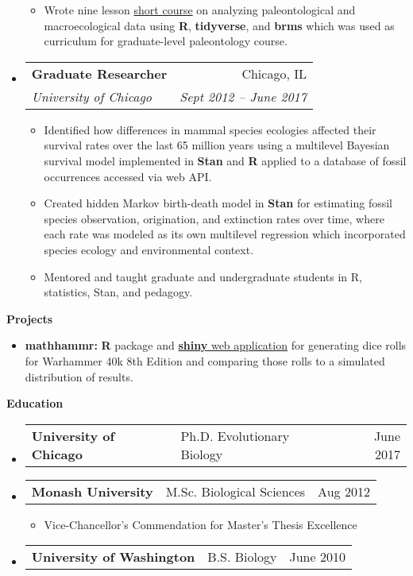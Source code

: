 \documentclass[letterpaper,10pt]{article}
\makeatletter
\newcommand{\resitem}[1]{\item #1 \vspace{-2pt}}
\newcommand{\resheading}[1]{
  {\large \colorbox{mygrey}{\begin{minipage}{\textwidth}{\textbf{#1 \vphantom{p\^{E}}}}\end{minipage}}}
}
\newcommand{\ressubheading}[4]{
  \begin{tabular*}{6.5in}{l@{\extracolsep{\fill}}r}
    \textbf{#1} & #2 \\
    \textit{#3} & \textit{#4} \\
\end{tabular*}\vspace{-6pt}}
\newcommand{\ressubheadingb}[3]{
  \begin{tabular*}{6.5in}{ll@{\extracolsep{\fill}}r}
    \textbf{#1} & \hspace{0.1mm} #2 & #3 \\
\end{tabular*}\vspace{-6pt}}
\makeatother
\begin{document}
\begin{itemize}[itemsep=0mm]
{\begin{itemize}
          \resitem{Wrote nine lesson \href{https://psmits.github.io/paleo_book/index.html}{short course} on analyzing paleontological and macroecological data using \textbf{R}, \textbf{tidyverse}, and \textbf{brms}  which was used as curriculum for graduate-level paleontology course.}
      \end{itemize}
    }
  \item 
    \ressubheading{Graduate Researcher}{Chicago, IL}{University of Chicago}{Sept 2012 -- June 2017}
    { %
      \begin{itemize}
          \resitem{Identified how differences in mammal species ecologies affected their survival rates over the last 65 million years using a multilevel Bayesian survival model implemented in \textbf{Stan} and \textbf{R} applied to a database of fossil occurrences accessed via web API.}
          \resitem{Created hidden Markov birth-death model in \textbf{Stan} for estimating fossil species observation, origination, and extinction rates over time, where each rate was modeled as its own multilevel regression which incorporated species ecology and environmental context.}
          \resitem{Mentored and taught graduate and undergraduate students in R, statistics, Stan, and pedagogy.}
      \end{itemize}
    }
\end{itemize}  %
\vspace{0.05in}


\resheading{Projects}
\begin{itemize}[itemsep=-1mm]
  \item \textbf{mathhammr:} \textbf{R} package and \href{https://psmits.shinyapps.io/dice_roller/}{\textbf{shiny} web application} for generating dice rolls for Warhammer 40k 8th Edition and comparing those rolls to a simulated distribution of results.
\end{itemize}


\resheading{Education}
\begin{itemize}
  \item
    \ressubheadingb{University of Chicago}{ Ph.D. Evolutionary Biology}{June 2017}
  \item
    \ressubheadingb{Monash University}{ M.Sc. Biological Sciences}{Aug 2012}
    \begin{itemize}
      \item {\small Vice-Chancellor's Commendation for Master's Thesis Excellence}
    \end{itemize} \vspace{-7.5pt}
  \item
    \ressubheadingb{University of Washington}{ B.S. Biology}{June 2010}
\end{itemize} %
\end{document}
